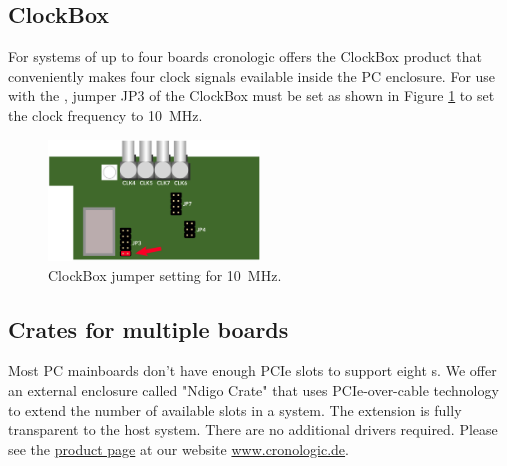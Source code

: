 {		\subsection{ClockBox}
			For systems of up to four boards cronologic offers the ClockBox product that conveniently makes four clock signals evailable 
			inside the PC enclosure. For use with the \deviceName, jumper JP3 of the ClockBox must be set as shown in Figure \ref{fig:clockbox} to set the clock frequency to 10~MHz. 
			\begin{figure}[ht]
				\begin{center}
					\includegraphics[width=0.5\textwidth]{xhptdc/figures/clockbox.pdf}				
					\caption{ClockBox jumper setting for 10~MHz.\label{fig:clockbox}}
				\end{center} 
			\end{figure}
		
		\subsection{Crates for multiple boards}
			Most PC mainboards don't have enough PCIe slots to support eight \deviceName s. 
			We offer an external enclosure called "Ndigo Crate" that uses PCIe-over-cable technology to extend the number of available slots in a system.
			The extension is fully transparent to the host system. There are no additional drivers required. 
			Please see the \href{https://www.cronologic.de/products/pcie/pcie-crates}{product page} at our website \url{www.cronologic.de}.
}{}




	


